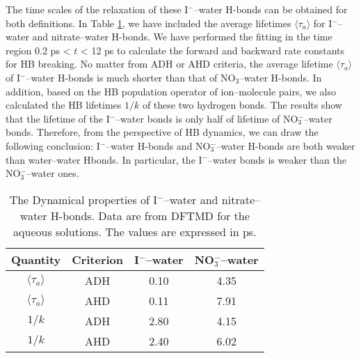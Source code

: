 The time scales of the relaxation of these I$^-$--water H-bonds can be obtained for both definitions. 
In Table \ref{tab:properties_anion-water_hbs}, we have included the average lifetimes $\langle\tau_{a}\rangle$ for I$^-$--water and nitrate--water H-bonds. 
We have performed the fitting in the time region 0.2 ps < $t$ < 12 ps to calculate the forward and backward rate constants for HB breaking.
No matter from ADH or AHD criteria, the average lifetime $\langle\tau_a\rangle$ of I$^-$--water H-bonds is much shorter than that of NO$_3$--water H-bonds.
In addition, based on the HB population operator of ion--molecule pairs, we also calculated the HB lifetimes $1/k$ of these two hydrogen bonds. 
The results show that the lifetime of the I$^-$--water bonds is only half of lifetime of NO$_3^-$--water bonds. Therefore, from the perspective of HB dynamics,
we can draw the following conclusion: I$^-$--water H-bonds and NO$_3^-$--water H-bonds are both weaker than water--water Hbonds. In particular, 
the I$^-$--water bonds is weaker than the NO$_3^-$--water ones.
\begin{table}[htbp]
\centering
\caption{ 
    The Dynamical properties of I$^-$--water and nitrate--water H-bonds. Data are from DFTMD for the aqueous solutions. The values are expressed in ps.} 
\begin{tabular}{cccc}
\label{tab:properties_anion-water_hbs}
 Quantity & Criterion & I$^-$--water & NO$_3^-$--water \\
\hline
  $\langle\tau_a\rangle$  & ADH & 0.10 & 4.35 \\
  $\langle\tau_a\rangle$ & AHD & 0.11 & 7.91 \\
  $1/k$ & ADH & 2.80 & 4.15 \\
  $1/k$ & AHD & 2.40 & 6.02\\
\end{tabular} %
\end{table}
%
%

